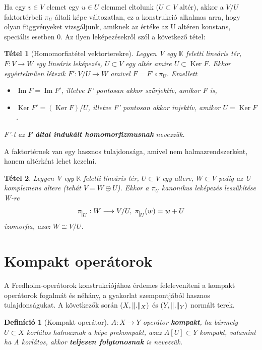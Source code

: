 \documentclass[oneside, titlepage, 12pt, a4paper]{report}
\newtheorem{theorem}{Tétel}[section]
\newtheorem{definition}{Definíció}[section]
\DeclareMathOperator{\Ima}{Im}	%
\DeclareMathOperator{\Ker}{Ker}	%
\DeclarePairedDelimiter\norm{\lVert}{\rVert}	%
\begin{document}
Ha egy $v \in V$ elemet egy $u \in U$ elemmel eltolunk ($U \subset V$ altér), akkor a $V / U$ faktortérbeli $\pi_U$ általi képe változatlan, ez a konstrukció alkalmas arra, hogy olyan függvényeket vizsgáljunk, amiknek az értéke az U altéren konstans, speciális esetben 0. Az ilyen leképezésekről szól a következő tétel:	%
\begin{theorem}[Homomorfiatétel vektorterekre]
Legyen V egy $\mathbb{K}$ feletti lineáris tér, $F : V \rightarrow W$ egy lineáris leképezés, $U \subset V$ egy altér amire $U \subset \Ker F$. Ekkor egyértelműen létezik $F' : V / U \rightarrow W$ amivel $F = F' \circ \pi_U$. Emellett
\begin{itemize}
\item
$\Ima F = \Ima F'$, illetve F' pontosan akkor szürjektív, amikor F is,
\item
$\Ker F' = (\Ker F) / U$, illetve F' pontosan akkor injektív, amikor $U = \Ker F$.
\end{itemize}
F'-t az \textbf{F által indukált homomorfizmusnak} nevezzük.	%
\end{theorem}

A faktortérnek van egy hasznos tulajdonsága, amivel nem halmazrendszerként, hanem altérként lehet kezelni.
\begin{theorem}
Legyen V egy $\mathbb{K}$ feletti lineáris tér, $U \subset V$ egy altere, $W \subset V$ pedig az U komplemens altere (tehát $V = W \oplus U$). Ekkor a $\pi_U$ kanonikus leképezés leszűkítése W-re
\begin{equation*}
\pi_{\mkern 1mu \vrule height 2ex\mkern2mu U} : W \longrightarrow V / U, \; \pi_{\mkern 1mu \vrule height 2ex\mkern2mu U}(w) = w + U
\end{equation*}
izomorfia, azaz $W \cong V / U$.
\end{theorem}



%
\section{Kompakt operátorok}
\label{sec:kompakt}

A Fredholm-operátorok konstrukciójához érdemes feleleveníteni a kompakt operátorok fogalmát és néhány, a gyakorlat szempontjából hasznos tulajdonságukat. A következők során $(X, \norm{.}_X)$ és $(Y, \norm{.}_Y)$ normált terek.
\begin{definition}[Kompakt operátor]
$A : X \rightarrow Y$ operátor \textbf{kompakt}, ha bármely $U \subset X$ korlátos halmaznak a képe prekompakt, azaz $\overline{A[U]} \subset Y$ kompakt, valamint ha A korlátos, akkor \textbf{teljesen folytonosnak} is nevezzük. \cite{funkanal}
\end{definition}
\end{document}

